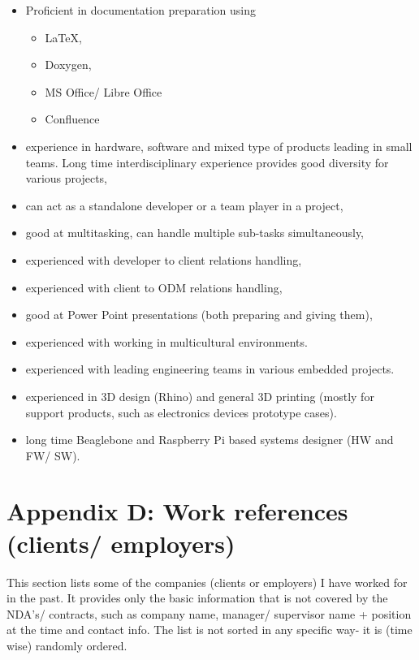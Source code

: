 \documentclass{tccv}
\begin{document}
\begin{itemize}
     \item Proficient in documentation preparation using 
     \begin{itemize}
          \item \LaTeX, 
          \item Doxygen,
          \item MS Office/ Libre Office
          \item Confluence
     \end{itemize}
     \item experience in hardware, software and mixed type of products leading in small teams. Long time interdisciplinary experience provides good diversity for various projects,
     \item can act as a standalone developer or a team player in a project,
     \item good at multitasking, can handle multiple sub-tasks simultaneously,
     \item experienced with developer to client relations handling,
     \item experienced with client to ODM relations handling,
     \item good at Power Point presentations (both preparing and giving them),
     \item experienced with working in multicultural environments.
     \item experienced with leading engineering teams in various embedded projects.
     \item experienced in 3D design (Rhino) and general 3D printing (mostly for support products, such as electronics devices prototype cases).
     \item long time Beaglebone and Raspberry Pi based systems designer (HW and FW/ SW).
      
\end{itemize}

\clearpage

\section{Appendix D: Work references (clients/ employers)}
\label{sec:clients}

This section lists some of the companies (clients or employers) I have worked for in the past. It provides only the basic information that is not covered by the NDA's/ contracts, such as company name, manager/ supervisor name + position at the time and contact info. The list is not sorted in any specific way- it is (time wise) randomly ordered. \\
\end{document}
